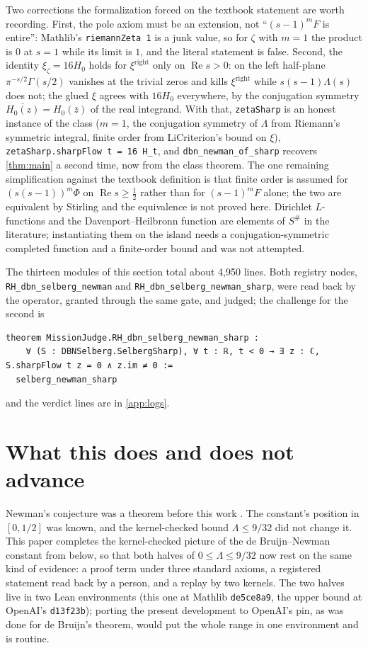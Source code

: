 \documentclass[11pt]{article}
\theoremstyle{definition}
\newcommand{\lean}[1]{\texttt{#1}}
\newcommand{\Lam}{\Lambda}
\newcommand{\Hfun}{H}
\newcommand{\re}{\operatorname{Re}}
\begin{document}
Two corrections the formalization forced on the textbook statement are worth recording. First, the pole axiom must be an extension, not ``$(s-1)^mF$ is entire'': Mathlib's \lean{riemannZeta 1} is a junk value, so for $\zeta$ with $m=1$ the product is $0$ at $s=1$ while its limit is $1$, and the literal statement is false. Second, the identity $\xi_\zeta = 16\Hfun_0$ holds for $\xi^{\mathrm{right}}$ only on $\re s>0$: on the left half-plane $\pi^{-s/2}\Gamma(s/2)$ vanishes at the trivial zeros and kills $\xi^{\mathrm{right}}$ while $s(s-1)\Lambda(s)$ does not; the glued $\xi$ agrees with $16\Hfun_0$ everywhere, by the conjugation symmetry $\overline{\Hfun_0(z)} = \Hfun_0(\bar z)$ of the real integrand. With that, \lean{zetaSharp} is an honest instance of the class ($m = 1$, the conjugation symmetry of $\Lambda$ from Riemann's symmetric integral, finite order from LiCriterion's bound on $\xi$), \lean{zetaSharp.sharpFlow t = 16 H\_t}, and \lean{dbn\_newman\_of\_sharp} recovers \cref{thm:main} a second time, now from the class theorem. The one remaining simplification against the textbook definition is that finite order is assumed for $(s(s-1))^m\Phi$ on $\re s\ge\tfrac12$ rather than for $(s-1)^mF$ alone; the two are equivalent by Stirling and the equivalence is not proved here. Dirichlet $L$-functions and the Davenport--Heilbronn function are elements of $S^\#$ in the literature; instantiating them on the island needs a conjugation-symmetric completed function and a finite-order bound and was not attempted.

The thirteen modules of this section total about 4,950 lines. Both registry nodes, \lean{RH\_dbn\_selberg\_newman} and \lean{RH\_dbn\_selberg\_newman\_sharp}, were read back by the operator, granted through the same gate, and judged; the challenge for the second is

\begin{lstlisting}
theorem MissionJudge.RH_dbn_selberg_newman_sharp :
    ∀ (S : DBNSelberg.SelbergSharp), ∀ t : ℝ, t < 0 → ∃ z : ℂ, S.sharpFlow t z = 0 ∧ z.im ≠ 0 :=
  selberg_newman_sharp
\end{lstlisting}

\noindent
and the verdict lines are in \cref{app:logs}.

\section{What this does and does not advance}\label{sec:frontier}

Newman's conjecture was a theorem before this work \cite{RT,Do}. The constant's position in $[0, 1/2]$ was known, and the kernel-checked bound $\Lam \le 9/32$ \cite{Murphy932} did not change it. This paper completes the kernel-checked picture of the de Bruijn--Newman constant from below, so that both halves of $0 \le \Lam \le 9/32$ now rest on the same kind of evidence: a proof term under three standard axioms, a registered statement read back by a person, and a replay by two kernels. The two halves live in two Lean environments (this one at Mathlib \lean{de5ce8a9}, the upper bound at OpenAI's \lean{d13f23b}); porting the present development to OpenAI's pin, as was done for de Bruijn's theorem, would put the whole range in one environment and is routine.
\end{document}
